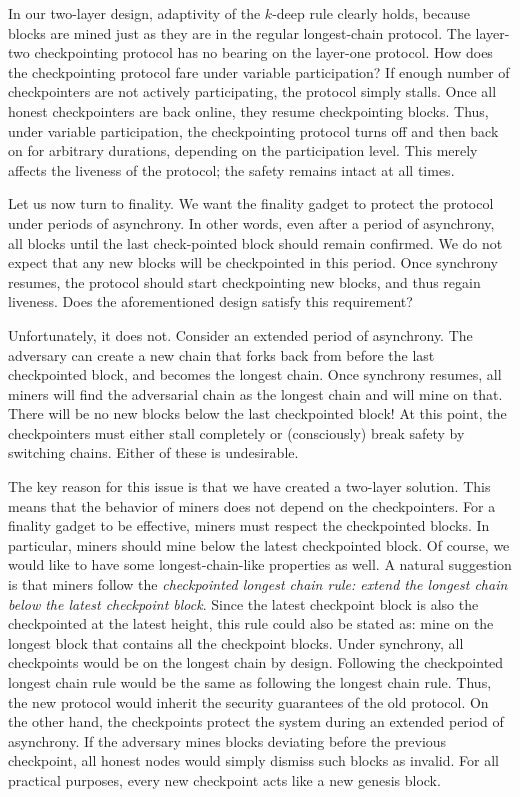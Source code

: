 \documentclass{article}
\begin{document}
In our two-layer design, adaptivity of the $k$-deep rule clearly holds, because blocks are mined just as they are in the regular longest-chain protocol. The layer-two checkpointing protocol has no bearing on the layer-one protocol. How does the checkpointing protocol fare under variable participation? If enough number of checkpointers are not actively participating, the protocol simply stalls. Once all honest checkpointers are back online, they resume checkpointing blocks. Thus, under variable participation, the checkpointing protocol turns off and then back on for arbitrary durations, depending on the participation level. This merely affects the liveness of the protocol; the safety remains intact at all times. 

Let us now turn to finality. We want the finality gadget to protect the protocol under periods of asynchrony. In other words, even after a period of asynchrony, all blocks until the last check-pointed block should remain confirmed. We do not expect that any new blocks will be checkpointed in this period. Once synchrony resumes, the protocol should start checkpointing new blocks, and thus regain liveness. Does the aforementioned design satisfy this requirement?

Unfortunately, it does not. Consider an extended period of asynchrony. The adversary can create a new chain that forks back from before the last checkpointed block, and becomes the longest chain. Once synchrony resumes, all miners will find the adversarial chain as the longest chain and will mine on that. There will be no new blocks below the last checkpointed block! At this point, the checkpointers must either stall completely or (consciously) break safety by switching chains. Either of these is undesirable. 

The key reason for this issue is that we have created a two-layer solution. This means that the behavior of miners does not depend on the checkpointers. For a finality gadget to be effective, miners must respect the checkpointed blocks. In particular, miners should mine below the latest checkpointed block. Of course, we would like to have some longest-chain-like properties as well. A natural suggestion is that miners follow the \textit{checkpointed longest chain rule: extend the longest chain below the latest checkpoint block}. Since the latest checkpoint block is also the checkpointed at the latest height, this rule could also be stated as: mine on the longest block that contains all the checkpoint blocks. Under synchrony, all checkpoints would be on the longest chain by design. Following the checkpointed longest chain rule would be the same as following the longest chain rule. Thus, the new protocol would inherit the security guarantees of the old protocol. On the other hand, the checkpoints protect the system during an extended period of asynchrony. If the adversary mines blocks deviating before the previous checkpoint, all honest nodes would simply dismiss such blocks as invalid. For all practical purposes, every new checkpoint acts like a new genesis block.
\end{document}
